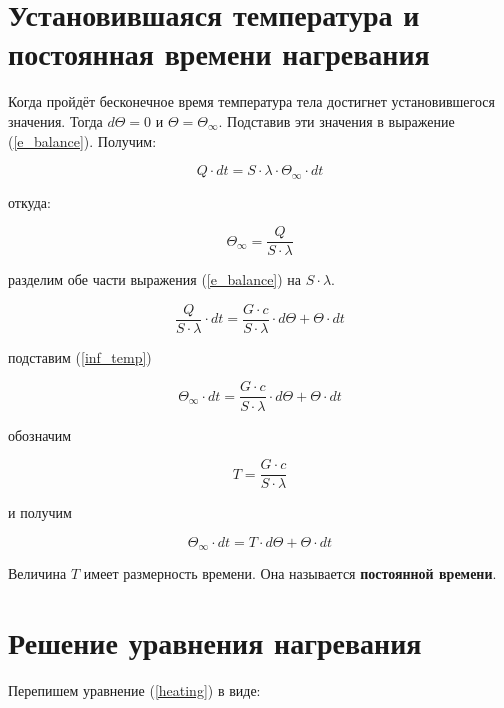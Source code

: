 \documentclass[a4paper]{article}
\begin{document}
\section{Установившаяся температура и постоянная времени нагревания}

    Когда пройдёт бесконечное время температура тела достигнет установившегося
значения. Тогда $d{\Theta}=0$ и ${\Theta}={\Theta}_\infty$. Подставив эти значения в
выражение (\ref{e_balance}). Получим:

\begin{equation}
Q{\cdot}dt=S{\cdot}{\lambda}{\cdot}{\Theta}_{\infty}{\cdot}dt
\end{equation}

откуда:

\begin{equation}
\label{inf_temp}
{\Theta}_{\infty}=\frac{Q}{S{\cdot}{\lambda}}
\end{equation}

разделим обе части выражения (\ref{e_balance}) на $S{\cdot}{\lambda}$.

\begin{equation}
\frac{Q}{S{\cdot}{\lambda}}{\cdot}dt=\frac{G{\cdot}c}{S{\cdot}{\lambda}}{\cdot}d{\Theta}+{\Theta}{\cdot}dt
\end{equation}

подставим (\ref{inf_temp})

\begin{equation}
{\Theta}_{\infty}{\cdot}dt=\frac{G{\cdot}c}{S{\cdot}{\lambda}}{\cdot}d{\Theta}+{\Theta}{\cdot}dt
\end{equation}

обозначим

\begin{equation}
T=\frac{G{\cdot}c}{S{\cdot}{\lambda}}
\end{equation}

и получим

\begin{equation}
\label{heating}
{\Theta}_{\infty}{\cdot}dt=T{\cdot}d{\Theta}+{\Theta}{\cdot}dt
\end{equation}

Величина $T$ имеет размерность времени. Она называется \textbf{постоянной времени}.

\section{Решение уравнения нагревания}

Перепишем уравнение (\ref{heating}) в виде:
\end{document}
